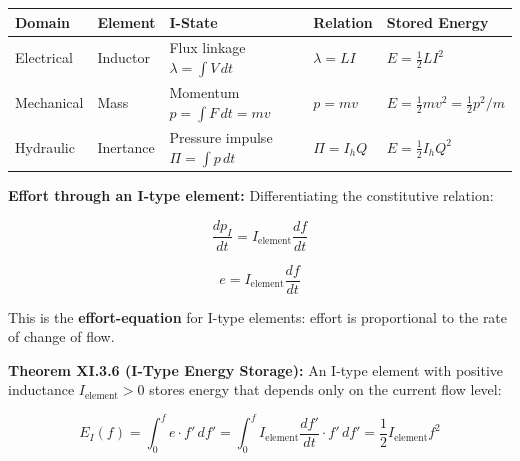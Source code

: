 \documentclass[
]{article}
\begin{document}
\begin{longtable}[]{@{}
  >{\raggedright\arraybackslash}p{}
  >{\raggedright\arraybackslash}p{}
  >{\raggedright\arraybackslash}p{}
  >{\raggedright\arraybackslash}p{}
  >{\raggedright\arraybackslash}p{}@{}}
\toprule\noalign{}
\begin{minipage}[b]{\linewidth}\raggedright
Domain
\end{minipage} & \begin{minipage}[b]{\linewidth}\raggedright
Element
\end{minipage} & \begin{minipage}[b]{\linewidth}\raggedright
I-State
\end{minipage} & \begin{minipage}[b]{\linewidth}\raggedright
Relation
\end{minipage} & \begin{minipage}[b]{\linewidth}\raggedright
Stored Energy
\end{minipage} \\
\midrule\noalign{}
\endhead
\bottomrule\noalign{}
\endlastfoot
Electrical & Inductor & Flux linkage \(\lambda = \int V\,dt\) &
\(\lambda = LI\) & \(E = \frac{1}{2}LI^2\) \\
Mechanical & Mass & Momentum \(p = \int F\,dt = mv\) & \(p = mv\) &
\(E = \frac{1}{2}mv^2 = \frac{1}{2}p^2/m\) \\
Hydraulic & Inertance & Pressure impulse \(\Pi = \int p\,dt\) &
\(\Pi = I_h Q\) & \(E = \frac{1}{2}I_h Q^2\) \\
\end{longtable}

\textbf{Effort through an I-type element:} Differentiating the
constitutive relation:

\[\frac{dp_I}{dt} = I_{\text{element}} \frac{df}{dt}\]

\[e = I_{\text{element}} \frac{df}{dt}\]

This is the \textbf{effort-equation} for I-type elements: effort is
proportional to the rate of change of flow.

\textbf{Theorem XI.3.6 (I-Type Energy Storage):} An I-type element with
positive inductance \(I_{\text{element}} > 0\) stores energy that
depends only on the current flow level:

\[E_I(f) = \int_0^f e \cdot f'\,df' = \int_0^f I_{\text{element}} \frac{df'}{dt} \cdot f'\,df' = \frac{1}{2}I_{\text{element}} f^2\]
\end{document}
